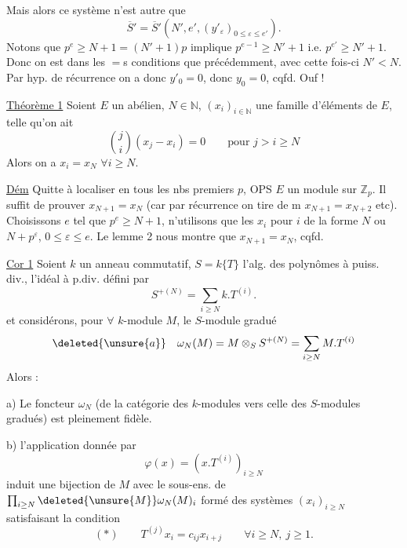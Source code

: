 
Mais alors ce système n'est autre que
\[
\overline S'=\overline S'(N',e',(y'_\varepsilon)_{0\leq\varepsilon\leq e'}).
\]
Notons que $p^e\geq N+1=(N'+1)p$ implique $p^{e-1}\geq N'+1$ i.e. $p^{e'}\geq N'+1$. Donc on est dans les $=$s conditions que précédemment, avec cette fois-ci $N'<N$. Par hyp. de récurrence on a donc $y'_0=0$, donc $y_0=0$, cqfd. Ouf !

\uline{Théorème 1} Soient $E$ un  abélien, $N\in\mathbb N$, $(x_i)_{i\in\mathbb N}$ une famille d'éléments de $E$, telle qu'on ait
\[
\binom ji(x_j-x_i)=0\qquad\text{pour }j>i\geq N
\]
Alors on a $x_i=x_N$ $\forall i\geq N$.

\uline{Dém} Quitte à localiser en tous les nbs premiers $p$, OPS $E$ un module sur  $\mathbb Z_p$. Il suffit de prouver $x_{N+1}=x_N$ (car par récurrence on tire de m $x_{N+1}=x_{N+2}$ etc). Choisissons $e$  tel que $p^e\geq N+1$, n'utilisons que les $x_i$ pour $i$ de la forme $N$ ou $N+p^\varepsilon$, $0\leq\varepsilon\leq e$. Le lemme 2 nous montre que $x_{N+1}=x_N$, cqfd.

\uline{Cor 1} Soient $k$ un anneau commutatif, $S=k\{T\}$ l'alg. des polynômes à puiss. div.,   l'idéal à p.div.  défini par
\[
S^{+(N)}=\sum_{i\geq N}k.T^{(i)}.
\]
et considérons, pour $\forall$ $k$-module $M$, le $S$-module gradué
\[
\deleted{\unsure{a}}\quad\omega_N(M)=M\otimes_S S^{+(N)}=\sum_{i\geq N}M.T^{(i)}
\]
Alors :


a) Le foncteur $\omega_N$ (de la catégorie des $k$-modules vers celle des $S$-modules gradués) est pleinement fidèle.

b)  l'application
donnée par
\[
\varphi(x)=(x.T^{(i)})_{i\geq N}
\]
induit une bijection de $M$ avec le sous-ens. de $\prod_{i\geq N}\deleted{\unsure{M}}\omega_N(M)_i$ formé des systèmes $(x_i)_{i\geq N}$ satisfaisant la condition
\[
(*)\qquad T^{(j)}x_i=c_{ij}x_{i+j}\qquad\forall i\geq N,\ j\geq1.
\]

